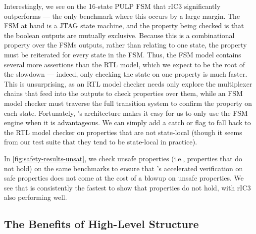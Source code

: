 \documentclass[acmsmall,screen,review]{acmart}
\begin{document}
Interestingly, we see on the 16-state PULP FSM that rIC3 significantly outperforms \toolname{} --- the only benchmark where this occurs by a large margin.
The FSM at hand is a JTAG state machine, and the property being checked is that the boolean outputs are mutually exclusive.
Because this is a combinational property over the FSMs outputs, rather than relating to one state, the property must be reiterated for every state in the FSM.
Thus, the FSM model contains several more assertions than the RTL model, which we expect to be the root of the slowdown --- indeed, only checking the state on one property is much faster.
This is unsurprising, as an RTL model checker needs only explore the multiplexer chains that feed into the outputs to check properties over them, while an FSM model checker must traverse the full transition system to confirm the property on each state.
Fortunately, \toolname{}'s architecture makes it easy for us to only use the FSM engine when it is advantageous.
We can simply add a catch or flag to fall back to the RTL model checker on properties that are not state-local (though it seems from our test suite that they tend to be state-local in practice).

In \autoref{fig:safety-results-unsat}, we check unsafe properties (i.e., properties that do not hold) on the same benchmarks to ensure that \toolname{}'s accelerated verification on safe properties does not come at the cost of a blowup on unsafe properties.
We see that \toolname{} is consistently the fastest to show that properties do not hold, with rIC3 also performing well.

\subsection{The Benefits of High-Level Structure}
\label{sec:chc-eval}
\end{document}
